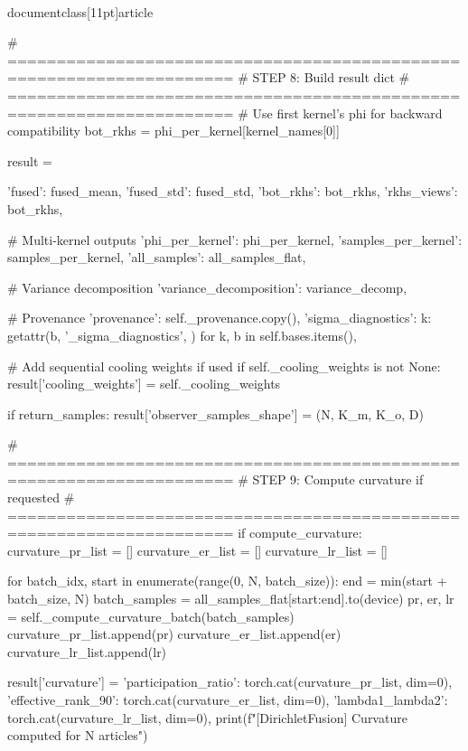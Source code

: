 \\documentclass[11pt]{article}
\begin{document}
\begin{CodeBlock}
{{{{        # =====================================================================
        # STEP 8: Build result dict
        # =====================================================================
        # Use first kernel's phi for backward compatibility
        bot_rkhs = phi_per_kernel[kernel_names[0]]
        
        result = {
            'fused': fused_mean,
            'fused_std': fused_std,
            'bot_rkhs': bot_rkhs,
            'rkhs_views': bot_rkhs,
            
            # Multi-kernel outputs
            'phi_per_kernel': phi_per_kernel,
            'samples_per_kernel': samples_per_kernel,
            'all_samples': all_samples_flat,
            
            # Variance decomposition
            'variance_decomposition': variance_decomp,
            
            # Provenance
            'provenance': self._provenance.copy(),
            'sigma_diagnostics': {k: getattr(b, '_sigma_diagnostics', {}) for k, b in self.bases.items()},
        }
        
        # Add sequential cooling weights if used
        if self._cooling_weights is not None:
            result['cooling_weights'] = self._cooling_weights
        
        if return_samples:
            result['observer_samples_shape'] = (N, K_m, K_o, D)
        
        # =====================================================================
        # STEP 9: Compute curvature if requested
        # =====================================================================
        if compute_curvature:
            curvature_pr_list = []
            curvature_er_list = []
            curvature_lr_list = []
            
            for batch_idx, start in enumerate(range(0, N, batch_size)):
                end = min(start + batch_size, N)
                batch_samples = all_samples_flat[start:end].to(device)
                pr, er, lr = self._compute_curvature_batch(batch_samples)
                curvature_pr_list.append(pr)
                curvature_er_list.append(er)
                curvature_lr_list.append(lr)
            
            result['curvature'] = {
                'participation_ratio': torch.cat(curvature_pr_list, dim=0),
                'effective_rank_90': torch.cat(curvature_er_list, dim=0),
                'lambda1_lambda2': torch.cat(curvature_lr_list, dim=0),
            }
            print(f"[DirichletFusion] Curvature computed for {N} articles")
        
}}}}
\end{CodeBlock}
\end{document}
